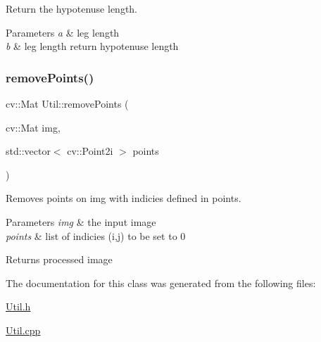 Return the hypotenuse length. 


\begin{DoxyParams}{Parameters}
{\em a} & leg length \\
\hline
{\em b} & leg length return hypotenuse length \\
\hline
\end{DoxyParams}
\hypertarget{class_util_abf2cc717b8e145166f247df2742a0325}{}\label{class_util_abf2cc717b8e145166f247df2742a0325} 
\subsubsection{\texorpdfstring{remove\+Points()}{removePoints()}}
{\footnotesize\ttfamily cv\+::\+Mat Util\+::remove\+Points (\begin{DoxyParamCaption}\item[{cv\+::\+Mat}]{img,  }\item[{std\+::vector$<$ cv\+::\+Point2i $>$}]{points }\end{DoxyParamCaption})\hspace{0.3cm}{\ttfamily [static]}}



Removes points on img with indicies defined in points. 


\begin{DoxyParams}{Parameters}
{\em img} & the input image \\
\hline
{\em points} & list of indicies (i,j) to be set to 0 \\
\hline
\end{DoxyParams}
\begin{DoxyReturn}{Returns}
processed image 
\end{DoxyReturn}


The documentation for this class was generated from the following files\+:\begin{DoxyCompactItemize}
\item 
\hyperlink{_util_8h}{Util.\+h}\item 
\hyperlink{_util_8cpp}{Util.\+cpp}\end{DoxyCompactItemize}
